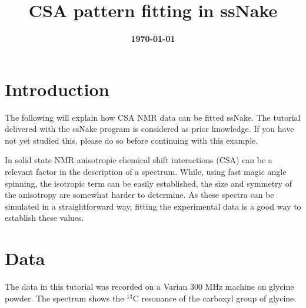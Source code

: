 \documentclass[11pt,a4paper]{article}
\title{\color{black}\fontfamily{SourceSansPro-LF}\bfseries CSA pattern fitting in ssNake}
\author{}
\date{\color{black}\fontfamily{SourceSansPro-LF}\bfseries \today}
\begin{document}

\maketitle

\section{Introduction}
The following will explain how CSA NMR data can be fitted ssNake.
 The
tutorial delivered with the ssNake program is considered as prior knowledge. If you have not yet
studied this, please do so before continuing with this example.

In solid state NMR anisotropic chemical shift interactions (CSA) can be a relevant factor in the
description of a spectrum. While, using fast magic angle spinning, the isotropic term can be easily
established, the size and symmetry of the anisotropy are somewhat harder to determine. As these
spectra can be simulated in a straightforward way, fitting the experimental data is a good way to
establish these values.


\section{Data}
The data in this tutorial was recorded on a Varian 300 MHz machine on glycine powder.
The spectrum shows the $^{13}$C resonance of the carboxyl group of glycine.
\end{document}
